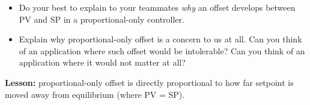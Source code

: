 \begin{itemize}
\item{} Do your best to explain to your teammates {\it why} an offset develops between PV and SP in a proportional-only controller.
\item{} Explain why proportional-only offset is a concern to us at all.  Can you think of an application where such offset would be intolerable?  Can you think of an application where it would not matter at all?
\end{itemize}














{\bf Lesson:} proportional-only offset is directly proportional to how far setpoint is moved away from equilibrium (where PV = SP).





